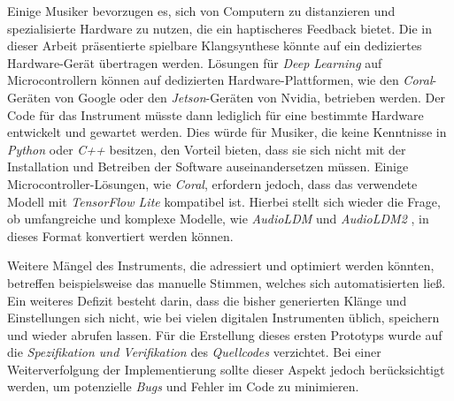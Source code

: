 \documentclass[
  a4paper,  %
  twoside,  %
  bibliography=totoc,
  headsepline,
  cleardoublepage=empty,
  parskip=half,
  draft=false
]{scrbook}
\begin{document}
Einige Musiker bevorzugen es, sich von Computern zu distanzieren und spezialisierte Hardware zu nutzen, die ein haptischeres Feedback bietet. Die in dieser Arbeit präsentierte spielbare Klangsynthese könnte auf ein dediziertes Hardware-Gerät übertragen werden. Lösungen für \emph{Deep Learning} auf Microcontrollern \cite{saha_machine_2022} können auf dedizierten Hardware-Plattformen, wie den \emph{Coral}-Geräten \cite{noauthor_coral_nodate} von Google oder den \emph{Jetson}-Geräten \cite{noauthor_jetson_nodate} von Nvidia, betrieben werden. Der Code für das Instrument müsste dann lediglich für eine bestimmte Hardware entwickelt und gewartet werden. Dies würde für Musiker, die keine Kenntnisse in \emph{Python} oder \emph{C++} besitzen, den Vorteil bieten, dass sie sich nicht mit der Installation und Betreiben der Software auseinandersetzen müssen. Einige Microcontroller-Lösungen, wie \emph{Coral}, erfordern jedoch, dass das verwendete Modell mit \emph{TensorFlow Lite} \cite{noauthor_tensorflow_nodate} kompatibel ist. Hierbei stellt sich wieder die Frage, ob umfangreiche und komplexe Modelle, wie \emph{AudioLDM} \cite{liu_audioldm_2023} und \emph{AudioLDM2} \cite{liu_audioldm2_2023}, in dieses Format konvertiert werden können.

Weitere Mängel des Instruments, die adressiert und optimiert werden könnten, betreffen beispielsweise das manuelle Stimmen, welches sich automatisierten ließ. Ein weiteres Defizit besteht darin, dass die bisher generierten Klänge und Einstellungen sich nicht, wie bei vielen digitalen Instrumenten üblich, speichern und wieder abrufen lassen. Für die Erstellung dieses ersten Prototyps wurde auf die \emph{Spezifikation und Verifikation} des \emph{Quellcodes} verzichtet. Bei einer Weiterverfolgung der Implementierung sollte dieser Aspekt jedoch berücksichtigt werden, um potenzielle \emph{Bugs} und Fehler im Code zu minimieren.
\end{document}
